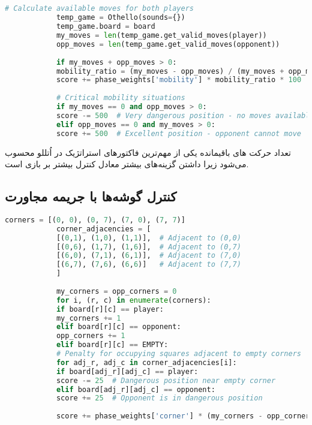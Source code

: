 \documentclass[12pt]{article}
\newenvironment{ltrcode}{\lr\bgroup}{\egroup}
\begin{document}
	\subsection{}
	
	\begin{ltrcode}
		\begin{lstlisting}[language=Python, caption=Enhanced Mobility Calculation]
			# Calculate available moves for both players
			temp_game = Othello(sounds={})
			temp_game.board = board
			my_moves = len(temp_game.get_valid_moves(player))
			opp_moves = len(temp_game.get_valid_moves(opponent))
			
			if my_moves + opp_moves > 0:
			mobility_ratio = (my_moves - opp_moves) / (my_moves + opp_moves + 1)
			score += phase_weights['mobility'] * mobility_ratio * 100
			
			# Critical mobility situations
			if my_moves == 0 and opp_moves > 0:
			score -= 500  # Very dangerous position - no moves available
			elif opp_moves == 0 and my_moves > 0:
			score += 500  # Excellent position - opponent cannot move
		\end{lstlisting}
	\end{ltrcode}
	
	تعداد حرکت های باقیمانده یکی از مهم‌ترین فاکتورهای استراتژیک در اُتللو محسوب می‌شود زیرا داشتن گزینه‌های بیشتر معادل کنترل بیشتر بر بازی است.
	
	\subsection{کنترل گوشه‌ها با جریمه مجاورت}
	
	\begin{ltrcode}
		\begin{lstlisting}[language=Python, caption=Corner Control with Adjacency Penalties]
			corners = [(0, 0), (0, 7), (7, 0), (7, 7)]
			corner_adjacencies = [
			[(0,1), (1,0), (1,1)],  # Adjacent to (0,0)
			[(0,6), (1,7), (1,6)],  # Adjacent to (0,7)
			[(6,0), (7,1), (6,1)],  # Adjacent to (7,0)
			[(6,7), (7,6), (6,6)]   # Adjacent to (7,7)
			]
			
			my_corners = opp_corners = 0
			for i, (r, c) in enumerate(corners):
			if board[r][c] == player:
			my_corners += 1
			elif board[r][c] == opponent:
			opp_corners += 1
			elif board[r][c] == EMPTY:
			# Penalty for occupying squares adjacent to empty corners
			for adj_r, adj_c in corner_adjacencies[i]:
			if board[adj_r][adj_c] == player:
			score -= 25  # Dangerous position near empty corner
			elif board[adj_r][adj_c] == opponent:
			score += 25  # Opponent is in dangerous position
			
			score += phase_weights['corner'] * (my_corners - opp_corners)
		\end{lstlisting}
	\end{ltrcode}
	
\end{document}

